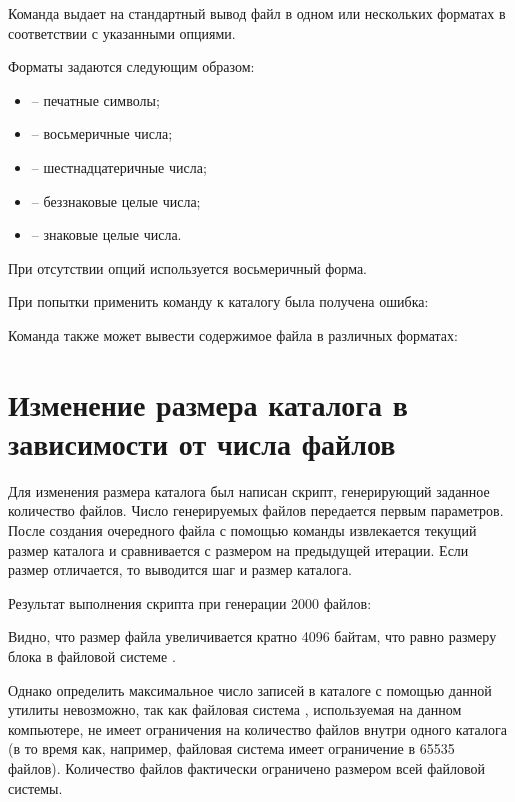 Команда  выдает на стандартный вывод файл в одном или нескольких форматах в соответствии с указанными опциями. 

Форматы задаются следующим образом:
\begin{itemize}
	\item {} -- печатные символы;
	\item {} -- восьмеричные числа;
	\item {} -- шестнадцатеричные числа;
	\item {} -- беззнаковые целые числа;
	\item {} -- знаковые целые числа.
\end{itemize}

При отсутствии опций используется восьмеричный форма.


При попытки применить команду к каталогу была получена ошибка:


Команда  также может вывести содержимое файла в различных форматах:


\section{Изменение размера каталога в зависимости от числа файлов}

Для изменения размера каталога был написан скрипт, генерирующий заданное количество файлов. Число генерируемых файлов передается первым параметров. После создания очередного файла с помощью команды  извлекается текущий размер каталога и сравнивается с размером на предыдущей итерации. Если размер отличается, то выводится шаг и размер каталога.


Результат выполнения скрипта при генерации 2000 файлов:


Видно, что размер файла увеличивается кратно 4096 байтам, что равно размеру блока в файловой системе . 

Однако определить максимальное число записей в каталоге с помощью данной утилиты невозможно, так как файловая система , используемая на данном компьютере, не имеет ограничения на количество файлов внутри одного каталога (в то время как, например, файловая система  имеет ограничение в 65535 файлов). Количество файлов фактически ограничено размером всей файловой системы.

